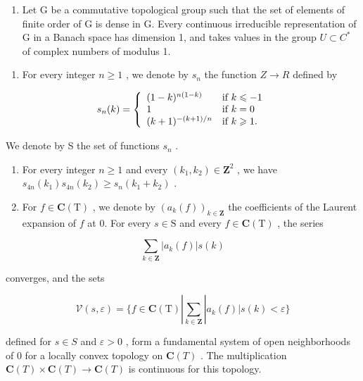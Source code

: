 \begin{enumerate}
\def\labelenumi{\alph{enumi})}
\setcounter{enumi}{2}
\tightlist
\item
  Let G be a commutative topological group such that the set of elements of finite order of G is dense in G. Every continuous irreducible representation of G in a Banach space has dimension 1, and takes values in the group \(U \subset C^{*}\) of complex numbers of modulus 1.
\end{enumerate}

\begin{enumerate}
\def\labelenumi{\arabic{enumi})}
\setcounter{enumi}{6}
\tightlist
\item
  For every integer \(n \geqslant 1\) , we denote by \(s_{n}\) the function \(Z \rightarrow R\) defined by
\end{enumerate}

\[
s _ {n} (k) = \left\{ \begin{array}{l l} (1 - k) ^ {n (1 - k)} & \text{if } k \leqslant - 1 \\ 1 & \text{if } k = 0 \\ (k + 1) ^ {- (k + 1) / n} & \text{if } k \geqslant 1. \end{array} \right.
\]

We denote by S the set of functions \(s_n\) .

\begin{enumerate}
\def\labelenumi{\alph{enumi})}
\item
  For every integer \(n \geqslant 1\) and every \((k_{1}, k_{2}) \in \mathbf{Z}^{2}\) , we have \(s_{4n}(k_{1})s_{4n}(k_{2}) \geqslant s_{n}(k_{1} + k_{2})\) .
\item
  For \(f \in \mathbf{C}(\mathrm{T})\) , we denote by \((a_k(f))_{k \in \mathbf{Z}}\) the coefficients of the Laurent expansion of \(f\) at 0. For every \(s \in \mathrm{S}\) and every \(f \in \mathbf{C}(\mathrm{T})\) , the series
\end{enumerate}

\[
\sum_ {k \in \mathbf {Z}} | a _ {k} (f) | s (k)
\]

converges, and the sets

\[
\mathcal {V} (s, \varepsilon) = \{f \in \mathbf {C} (\mathrm{T}) | \sum_ {k \in \mathbf {Z}} | a _ {k} (f) | s (k) <   \varepsilon \}
\]

defined for \(s \in S\) and \(\varepsilon > 0\) , form a fundamental system of open neighborhoods of 0 for a locally convex topology on \(\mathbf{C}(T)\) . The multiplication \(\mathbf{C}(T) \times \mathbf{C}(T) \to \mathbf{C}(T)\) is continuous for this topology.

